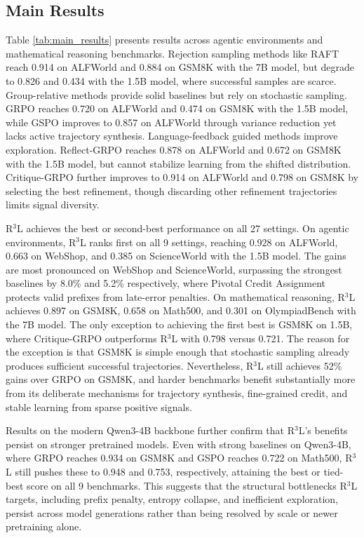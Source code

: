 \documentclass[11pt]{article}
\theoremstyle{definition}
\theoremstyle{remark}
\begin{document}
\subsection{Main Results}
Table \ref{tab:main_results} presents results across agentic environments and mathematical reasoning benchmarks. Rejection sampling methods like RAFT reach 0.914 on ALFWorld and 0.884 on GSM8K with the 7B model, but degrade to 0.826 and 0.434 with the 1.5B model, where successful samples are scarce. Group-relative methods provide solid baselines but rely on stochastic sampling. GRPO reaches 0.720 on ALFWorld and 0.474 on GSM8K with the 1.5B model, while GSPO improves to 0.857 on ALFWorld through variance reduction yet lacks active trajectory synthesis. Language-feedback guided methods improve exploration. Reflect-GRPO reaches 0.878 on ALFWorld and 0.672 on GSM8K with the 1.5B model, but cannot stabilize learning from the shifted distribution. Critique-GRPO further improves to 0.914 on ALFWorld and 0.798 on GSM8K by selecting the best refinement, though discarding other refinement trajectories limits signal diversity.

R$^3$L achieves the best or second-best performance on all 27 settings. On agentic environments, R$^3$L ranks first on all 9 settings, reaching 0.928 on ALFWorld, 0.663 on WebShop, and 0.385 on ScienceWorld with the 1.5B model. The gains are most pronounced on WebShop and ScienceWorld, surpassing the strongest baselines by 8.0\% and 5.2\% respectively, where Pivotal Credit Assignment protects valid prefixes from late-error penalties. On mathematical reasoning, R$^3$L achieves 0.897 on GSM8K, 0.658 on Math500, and 0.301 on OlympiadBench with the 7B model. The only exception to achieving the first best is GSM8K on 1.5B, where Critique-GRPO outperforms R$^3$L with 0.798 versus 0.721. The reason for the exception is that GSM8K is simple enough that stochastic sampling already produces sufficient successful trajectories. Nevertheless, R$^3$L still achieves 52\% gains over GRPO on GSM8K, and harder benchmarks benefit substantially more from its deliberate mechanisms for trajectory synthesis, fine-grained credit, and stable learning from sparse positive signals.

Results on the modern Qwen3-4B backbone further confirm that R$^3$L's benefits persist on stronger pretrained models. Even with strong baselines on Qwen3-4B, where GRPO reaches 0.934 on GSM8K and GSPO reaches 0.722 on Math500, R$^3$L still pushes these to 0.948 and 0.753, respectively, attaining the best or tied-best score on all 9 benchmarks. This suggests that the structural bottlenecks R$^3$L targets, including prefix penalty, entropy collapse, and inefficient exploration, persist across model generations rather than being resolved by scale or newer pretraining alone.
\end{document}
